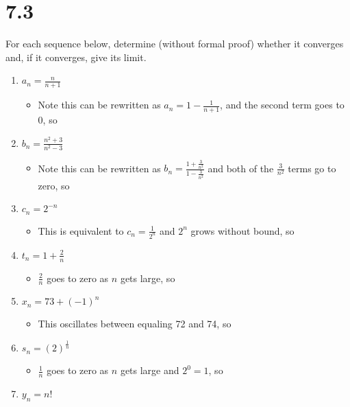 \documentclass[10pt,a4paper]{article}
\theoremstyle{definition}
\begin{document}
\section*{7.3}
For each sequence below, determine (without formal proof) whether it converges and, if it converges, give its limit.
\begin{enumerate}[label = (\alph*)]
\item $\displaystyle a_n = \frac{n}{n + 1}$
	\begin{itemize}
	\item Note this can be rewritten as $\displaystyle a_n = 1 - \frac{1}{n + 1}$, and the second term goes to 0, so 
	\end{itemize}
\item $\displaystyle b_n = \frac{n^2 + 3}{n^2 - 3}$
	\begin{itemize}
	\item Note this can be rewritten as $\displaystyle b_n = \frac{1 + \frac{3}{n^2}}{1 - \frac{3}{n^2}}$ and both of the $\displaystyle \frac{3}{n^2}$ terms go to zero, so 
	\end{itemize}
\item $\displaystyle c_n = 2^{-n}$
	\begin{itemize}
	\item This is equivalent to $\displaystyle c_n = \frac{1}{2^n}$ and $2^n$ grows without bound, so 
	\end{itemize}
\item $\displaystyle t_n = 1 + \frac{2}{n}$
	\begin{itemize}
	\item $\displaystyle \frac{2}{n}$ goes to zero as $n$ gets large, so 
	\end{itemize}
\item $\displaystyle x_n = 73 + (-1)^n$
	\begin{itemize}
	\item This oscillates between equaling 72 and 74, so 
	\end{itemize}
\item $\displaystyle s_n = (2)^{\frac{1}{n}}$
	\begin{itemize}
	\item $\displaystyle \frac{1}{n}$ goes to zero as $n$ gets large and $2^0 = 1$, so 
	\end{itemize}
\item $\displaystyle y_n = n!$

\end{enumerate}
\end{document}
